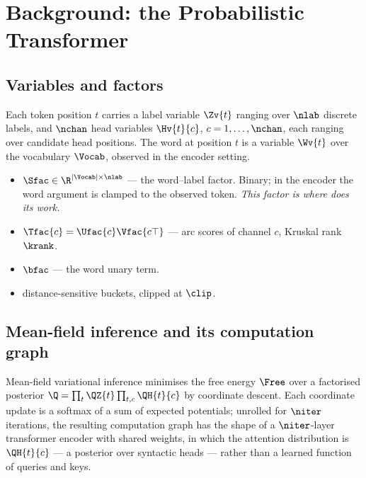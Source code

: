 \section{Background: the Probabilistic Transformer}
\label{sec:background}


\subsection{Variables and factors}

Each token position $t$ carries a label variable $\Zv{t}$ ranging over $\nlab$ discrete labels,
and $\nchan$ head variables $\Hv{t}{c}$, $c = 1,\dots,\nchan$, each ranging over candidate
head positions. The word at position $t$ is a variable $\Wv{t}$ over the vocabulary $\Vocab$,
observed in the encoder setting.


\begin{itemize}
  \item $\Sfac \in \R^{|\Vocab| \times \nlab}$ --- the word--label factor. Binary; in the
        encoder the word argument is clamped to the observed token. \emph{This factor is where
         does its work.}
  \item $\Tfac{c} = \Ufac{c}\Vfac{c\top}$ --- arc scores of channel $c$, Kruskal rank $\krank$.
  \item $\bfac$ --- the word unary term.
  \item distance-sensitive buckets, clipped at $\clip$.
\end{itemize}

\subsection{Mean-field inference and its computation graph}

Mean-field variational inference minimises the free energy $\Free$ over a factorised posterior
$\Q = \prod_t \QZ{t} \prod_{t,c} \QH{t}{c}$ by coordinate descent. Each coordinate update is a
softmax of a sum of expected potentials; unrolled for $\niter$ iterations, the resulting
computation graph has the shape of a $\niter$-layer transformer encoder with shared weights, in
which the attention distribution is $\QH{t}{c}$ --- a posterior over syntactic heads --- rather
than a learned function of queries and keys.

